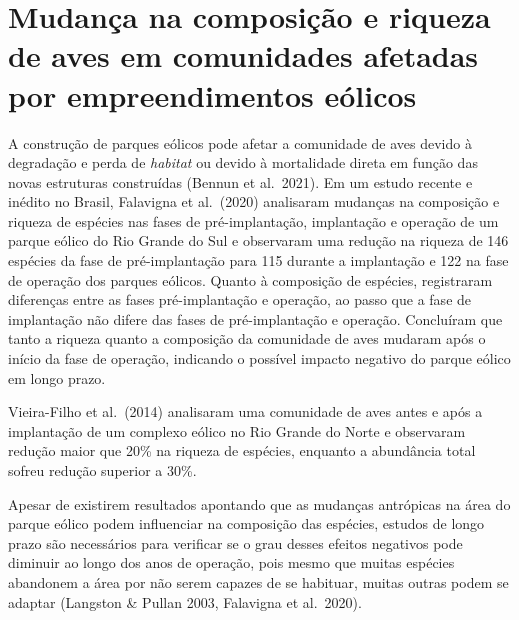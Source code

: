 \documentclass[
  oneside]{scrbook}
\begin{document}
\hypertarget{mudanuxe7a-na-composiuxe7uxe3o-e-riqueza-de-aves-em-comunidades-afetadas-por-empreendimentos-euxf3licos}{%
\section{Mudança na composição e riqueza de aves em comunidades afetadas por empreendimentos eólicos}\label{mudanuxe7a-na-composiuxe7uxe3o-e-riqueza-de-aves-em-comunidades-afetadas-por-empreendimentos-euxf3licos}}

A construção de parques eólicos pode afetar a comunidade de aves devido à degradação e perda de \emph{habitat} ou devido à mortalidade direta em função das novas estruturas construídas (Bennun et al.~2021). Em um estudo recente e inédito no Brasil, Falavigna et al.~(2020) analisaram mudanças na composição e riqueza de espécies nas fases de pré-implantação, implantação e operação de um parque eólico do Rio Grande do Sul e observaram uma redução na riqueza de 146 espécies da fase de pré-implantação para 115 durante a implantação e 122 na fase de operação dos parques eólicos. Quanto à composição de espécies, registraram diferenças entre as fases pré-implantação e operação, ao passo que a fase de implantação não difere das fases de pré-implantação e operação. Concluíram que tanto a riqueza quanto a composição da comunidade de aves mudaram após o início da fase de operação, indicando o possível impacto negativo do parque eólico em longo prazo.

Vieira-Filho et al.~(2014) analisaram uma comunidade de aves antes e após a implantação de um complexo eólico no Rio Grande do Norte e observaram redução maior que 20\% na riqueza de espécies, enquanto a abundância total sofreu redução superior a 30\%.

Apesar de existirem resultados apontando que as mudanças antrópicas na área do parque eólico podem influenciar na composição das espécies, estudos de longo prazo são necessários para verificar se o grau desses efeitos negativos pode diminuir ao longo dos anos de operação, pois mesmo que muitas espécies abandonem a área por não serem capazes de se habituar, muitas outras podem se adaptar (Langston \& Pullan 2003, Falavigna et al.~2020).
\end{document}
